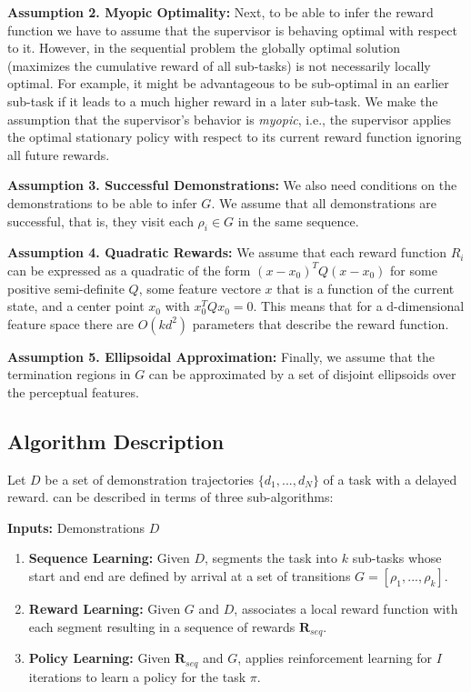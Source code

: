 \vspace{0.5em}\noindent\textbf{Assumption 2. Myopic Optimality: } Next, to be able to infer the reward function we have to assume that the supervisor is behaving optimal with respect to it. However, in the sequential problem the globally optimal solution (maximizes the cumulative reward of all sub-tasks) is not necessarily locally optimal. For example, it might be advantageous to be sub-optimal in an earlier sub-task if it leads to a much higher reward in a later sub-task. We make the assumption that the supervisor's behavior is \emph{myopic}, i.e., the supervisor applies the optimal stationary policy with respect to its current reward function ignoring all future rewards. 

\vspace{0.5em}\noindent\textbf{Assumption 3. Successful Demonstrations: } We also need conditions on the demonstrations to be able to infer $G$. We assume that all demonstrations are successful, that is, they visit each $\rho_i \in G$ in the same sequence.

\vspace{0.5em}\noindent\textbf{Assumption 4. Quadratic Rewards: } We assume that each reward function $R_i$ can be expressed as a quadratic of the form $(x-x_0)^T Q (x - x_0)$ for some positive semi-definite $Q$, some feature vectore $x$ that is a function of the current state, and a center point $x_0$ with $x_0^T Q x_0 = 0$. This means that for a d-dimensional feature space there are $O(kd^2)$ parameters that describe the reward function.


\vspace{0.5em}\noindent\textbf{Assumption 5. Ellipsoidal Approximation: } Finally, we assume that the termination regions in $G$ can be approximated by a set of disjoint ellipsoids over the perceptual features.

\subsection{Algorithm Description}
Let $D$ be a set of demonstration trajectories $\{d_1,...,d_N\}$ of a task with a delayed reward.
\hirl can be described in terms of three sub-algorithms:

\vspace{2pt}
\noindent\textbf{Inputs:} Demonstrations $D$
\begin{enumerate}[
    topsep=0pt,
    noitemsep,
    leftmargin=*,
    ]
    \item \textbf{Sequence Learning: } Given $D$, \hirl segments the task into $k$ sub-tasks whose start and end are defined by arrival at a set of transitions $G = [\rho_1,...,\rho_k]$.
    \item \textbf{Reward Learning: } Given $G$ and $D$, \hirl associates a local reward function with each segment resulting in a sequence of rewards $\mathbf{R}_{seq}$. 
    \item \textbf{Policy Learning: } Given $\mathbf{R}_{seq}$ and $G$, \hirl applies reinforcement learning for $I$ iterations to learn a policy for the task $\pi$. 
\end{enumerate}

